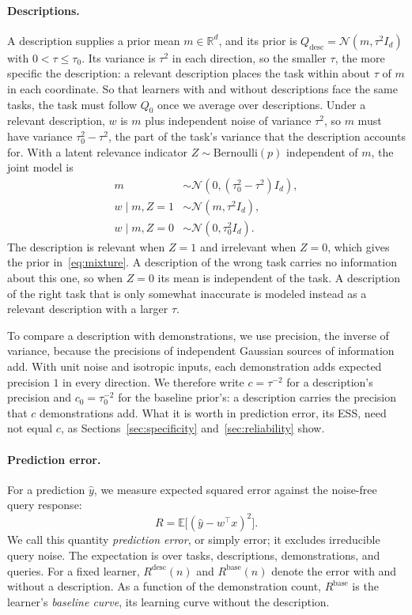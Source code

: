 \documentclass{article}
\theoremstyle{definition}
\newcommand{\E}{\mathbb{E}}
\newcommand{\R}{\mathbb{R}}
\begin{document}
\paragraph{Descriptions.}
A description supplies a prior mean $m\in\R^d$, and its prior is $Q_{\mathrm{desc}}=\mathcal{N}(m,\tau^2I_d)$ with $0<\tau\leq\tau_0$. Its variance is $\tau^2$ in each direction, so the smaller $\tau$, the more specific the description: a relevant description places the task within about $\tau$ of $m$ in each coordinate. So that learners with and without descriptions face the same tasks, the task must follow $Q_0$ once we average over descriptions. Under a relevant description, $w$ is $m$ plus independent noise of variance $\tau^2$, so $m$ must have variance $\tau_0^2-\tau^2$, the part of the task's variance that the description accounts for. With a latent relevance indicator $Z\sim\mathrm{Bernoulli}(p)$ independent of $m$, the joint model is
\begin{align*}
m&\sim\mathcal{N}(0,(\tau_0^2-\tau^2)I_d),\\
w\mid m,Z=1&\sim\mathcal{N}(m,\tau^2I_d),\\
w\mid m,Z=0&\sim\mathcal{N}(0,\tau_0^2I_d).
\end{align*}
The description is relevant when $Z=1$ and irrelevant when $Z=0$, which gives the prior in~\eqref{eq:mixture}. A description of the wrong task carries no information about this one, so when $Z=0$ its mean is independent of the task. A description of the right task that is only somewhat inaccurate is modeled instead as a relevant description with a larger $\tau$.

To compare a description with demonstrations, we use precision, the inverse of variance, because the precisions of independent Gaussian sources of information add. With unit noise and isotropic inputs, each demonstration adds expected precision $1$ in every direction. We therefore write $c=\tau^{-2}$ for a description's precision and $c_0=\tau_0^{-2}$ for the baseline prior's: a description carries the precision that $c$ demonstrations add. What it is worth in prediction error, its ESS, need not equal $c$, as Sections~\ref{sec:specificity} and~\ref{sec:reliability} show.

\paragraph{Prediction error.}
For a prediction $\hat y$, we measure expected squared error against the noise-free query response:
\begin{equation}\label{eq:regret}
R=\E\big[(\hat y-w^\top x)^2\big].
\end{equation}
We call this quantity \emph{prediction error}, or simply error; it excludes irreducible query noise. The expectation is over tasks, descriptions, demonstrations, and queries. For a fixed learner, $R^{\mathrm{desc}}(n)$ and $R^{\mathrm{base}}(n)$ denote the error with and without a description. As a function of the demonstration count, $R^{\mathrm{base}}$ is the learner's \emph{baseline curve}, its learning curve without the description.
\end{document}
